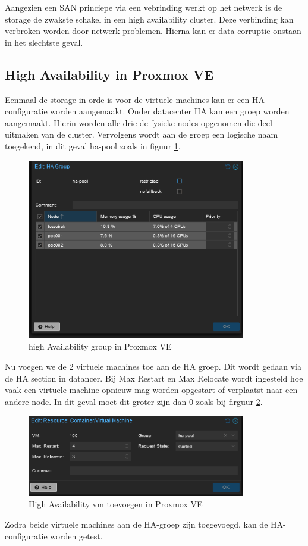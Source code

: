 Aangezien een SAN princiepe via een vebrinding werkt op het netwerk is de storage de zwakste schakel in een high availability cluster. Deze verbinding kan verbroken worden door netwerk problemen. Hierna kan er data corruptie onstaan in het slechtste geval.

\subsection{High Availability in Proxmox VE}

Eenmaal de storage in orde is voor de virtuele machines kan er een HA configuratie worden aangemaakt. 
Onder datacenter HA kan een groep worden aangemaakt. Hierin worden alle drie de fysieke nodes opgenomen die deel uitmaken van de cluster. Vervolgens wordt aan de groep een logische naam toegekend, in dit geval ha-pool zoals in figuur \ref{fig:ha-group}.
\begin{figure}[H]
  \centering
  \includegraphics[width=0.85\textwidth]{../poc/ha-group.png}
  \caption{high Availability group in Proxmox VE}
  \label{fig:ha-group}
\end{figure}
Nu voegen we de 2 virtuele machines toe aan de HA groep. Dit wordt gedaan via de HA section in datancer.
Bij Max Restart en Max Relocate wordt ingesteld hoe vaak een virtuele machine opnieuw mag worden opgestart of verplaatst naar een andere node. In dit geval moet dit groter zijn dan 0 zoals bij firguur \ref{fig:ha-vm}.
\begin{figure}[H]
  \centering
  \includegraphics[width=0.85\textwidth]{../poc/vm-ha.png}
  \caption{High Availability vm toevoegen in Proxmox VE}
  \label{fig:ha-vm}
\end{figure}
Zodra beide virtuele machines aan de HA-groep zijn toegevoegd, kan de HA-configuratie worden getest.


